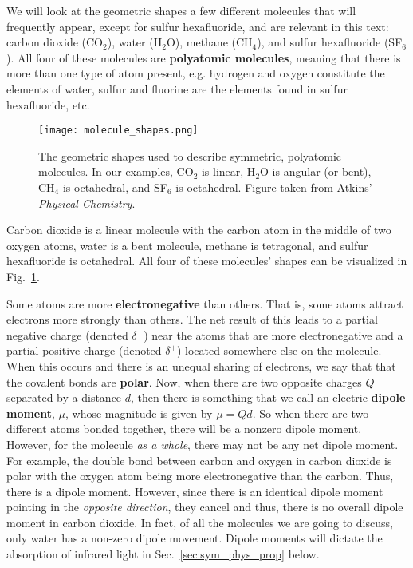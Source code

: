     We will look at the geometric shapes a few different molecules that will frequently appear, except for sulfur hexafluoride, and are relevant in this text: carbon dioxide (CO$_2$), water (H$_2$O), methane (CH$_4$), and sulfur hexafluoride (SF$_6$). All four of these molecules are \textbf{polyatomic molecules}, meaning that there is more than one type of atom present, e.g. hydrogen and oxygen constitute the elements of water, sulfur and fluorine are the elements found in sulfur hexafluoride, etc. 

    \begin{figure}[ht]
        \centering
        \texttt{[image: molecule\_shapes.png]}
        \caption{The geometric shapes used to describe symmetric, polyatomic molecules. In our examples, CO$_2$ is linear, H$_2$O is angular (or bent), CH$_4$ is octahedral, and SF$_6$ is octahedral. Figure taken from Atkins' \emph{Physical Chemistry}.\cite{atkins2014physical}}
        \label{fig:shapes}
    \end{figure}

    Carbon dioxide is a linear molecule with the carbon atom in the middle of two oxygen atoms, water is a bent molecule, methane is tetragonal, and sulfur hexafluoride is octahedral. All four of these molecules' shapes can be visualized in Fig.~\ref{fig:shapes}.

    Some atoms are more \textbf{electronegative} than others. That is, some atoms attract electrons more strongly than others. The net result of this leads to a partial negative charge (denoted $\delta^-$) near the atoms that are more electronegative and a partial positive charge (denoted $\delta^+$) located somewhere else on the molecule. When this occurs and there is an unequal sharing of electrons, we say that that the covalent bonds are \textbf{polar}. Now, when there are two opposite charges $Q$ separated by a distance $d$, then there is something that we call an electric \textbf{dipole moment}, $\mu$, whose magnitude is given by \( \mu = Q d. \) So when there are two different atoms bonded together, there will be a nonzero dipole moment. However, for the molecule \emph{as a whole}, there may not be any net dipole moment. For example, the double bond between carbon and oxygen in carbon dioxide is polar with the oxygen atom being more electronegative than the carbon. Thus, there is a dipole moment. However, since there is an identical dipole moment pointing in the \emph{opposite direction}, they cancel and thus, there is no overall dipole moment in carbon dioxide. In fact, of all the molecules we are going to discuss, only water has a non-zero dipole movement. Dipole moments will dictate the absorption of infrared light in Sec.~\ref{sec:sym_phys_prop} below.\cite{atkins2014physical,harris1978symmetry,bishop1993group}

